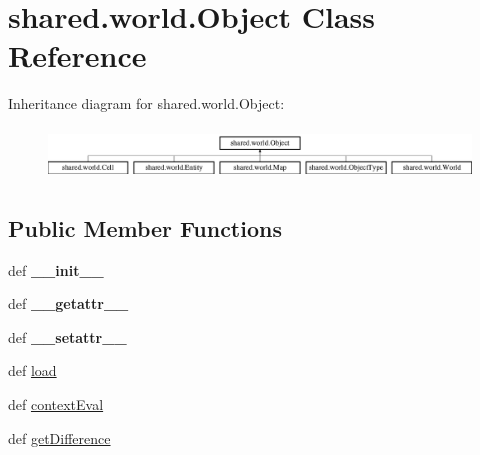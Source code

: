 \hypertarget{classshared_1_1world_1_1_object}{\section{shared.\-world.\-Object \-Class \-Reference}
\label{classshared_1_1world_1_1_object}
}
\-Inheritance diagram for shared.\-world.\-Object\-:\begin{figure}[H]
\begin{center}
\leavevmode
\includegraphics[height=1.374233cm]{classshared_1_1world_1_1_object}
\end{center}
\end{figure}
\subsection*{\-Public \-Member \-Functions}
\begin{DoxyCompactItemize}
\item 
\hypertarget{classshared_1_1world_1_1_object_a3e0fd545406897583162d2ef5e4c1efd}{def {\bfseries \-\_\-\-\_\-init\-\_\-\-\_\-}}\label{classshared_1_1world_1_1_object_a3e0fd545406897583162d2ef5e4c1efd}

\item 
\hypertarget{classshared_1_1world_1_1_object_a0ed49499ad434b136fefc6bf73f795c3}{def {\bfseries \-\_\-\-\_\-getattr\-\_\-\-\_\-}}\label{classshared_1_1world_1_1_object_a0ed49499ad434b136fefc6bf73f795c3}

\item 
\hypertarget{classshared_1_1world_1_1_object_a7944a9aa5b101263482b3cda9cd8f921}{def {\bfseries \-\_\-\-\_\-setattr\-\_\-\-\_\-}}\label{classshared_1_1world_1_1_object_a7944a9aa5b101263482b3cda9cd8f921}

\item 
def \hyperlink{classshared_1_1world_1_1_object_a48f8ec6740871d4ab7bbd41c6c1edb43}{load}
\item 
def \hyperlink{classshared_1_1world_1_1_object_a6e7973a0f3321029860ced6e31af271f}{context\-Eval}
\item 
def \hyperlink{classshared_1_1world_1_1_object_a66c73bff302b129a5dedc66b605f501b}{get\-Difference}
\end{DoxyCompactItemize}
